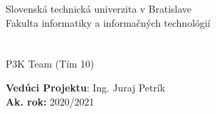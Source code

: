 \newcommand{\fiitmark}{%
\large
\textnormal{%
Slovenská technická univerzita v Bratislave \\
\vspace*{.25cm}
Fakulta informatiky a informačných technológií} \\
}

\begin{titlepage}
        \begin{center}
            \vspace*{.5cm}
            \fiitmark

            \vfill
            \huge
            \textbf{\documenttitle} \\

            \vspace*{.25cm}
            \large
            \textbf{\documentsubtitle} \\

            \vspace*{.25cm}
            \textnormal{P3K Team (Tím 10)} \\

        \end{center}

        \vfill

        \begin{flushleft}
            \textbf{Vedúci Projektu}: Ing. Juraj Petrík \\
            \textbf{Ak. rok:} 2020/2021
        \end{flushleft}
\end{titlepage}
